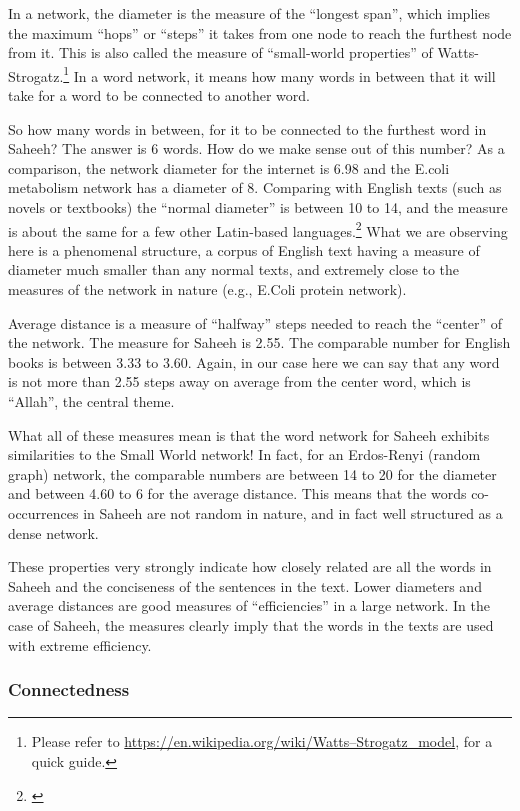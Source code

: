 \documentclass[
]{article}
\begin{document}
In a network, the diameter is the measure of the ``longest span'', which implies the maximum ``hops'' or ``steps'' it takes from one node to reach the furthest node from it. This is also called the measure of ``small-world properties'' of Watts-Strogatz.\footnote{Please refer to \url{https://en.wikipedia.org/wiki/Watts–Strogatz_model}, for a quick guide.} In a word network, it means how many words in between that it will take for a word to be connected to another word.

So how many words in between, for it to be connected to the furthest word in Saheeh? The answer is 6 words. How do we make sense out of this number? As a comparison, the network diameter for the internet is 6.98 and the E.coli metabolism network has a diameter of 8. Comparing with English texts (such as novels or textbooks) the ``normal diameter'' is between 10 to 14, and the measure is about the same for a few other Latin-based languages.\footnote{\citet{ban2014}} What we are observing here is a phenomenal structure, a corpus of English text having a measure of diameter much smaller than any normal texts, and extremely close to the measures of the network in nature (e.g., E.Coli protein network).

Average distance is a measure of ``halfway'' steps needed to reach the ``center'' of the network. The measure for Saheeh is 2.55. The comparable number for English books is between 3.33 to 3.60. Again, in our case here we can say that any word is not more than 2.55 steps away on average from the center word, which is ``Allah'', the central theme.

What all of these measures mean is that the word network for Saheeh exhibits similarities to the Small World network! In fact, for an Erdos-Renyi (random graph) network, the comparable numbers are between 14 to 20 for the diameter and between 4.60 to 6 for the average distance.\citep{ban2014} This means that the words co-occurrences in Saheeh are not random in nature, and in fact well structured as a dense network.

These properties very strongly indicate how closely related are all the words in Saheeh and the conciseness of the sentences in the text. Lower diameters and average distances are good measures of ``efficiencies'' in a large network. In the case of Saheeh, the measures clearly imply that the words in the texts are used with extreme efficiency.

\hypertarget{connectedness}{%
\subsubsection{Connectedness}\label{connectedness}}
\end{document}
